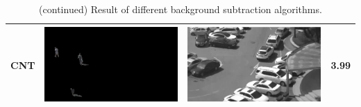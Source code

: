 \documentclass[11pt]{hyu_thesis}
\begin{document}
\begin{table}
\begin{tabular}{cccc}
		CNT & \parbox[c]{0.35\linewidth}{\includegraphics[width=\linewidth]{bgm-fg-CNT.png}} & \parbox[c]{0.35\linewidth}{\includegraphics[width=\linewidth]{bgm-bg-CNT.png}} & 3.99 \\
		\hline
	\end{tabular}
\caption{(continued) Result of different background subtraction algorithms.}
\end{table}
\end{document}
